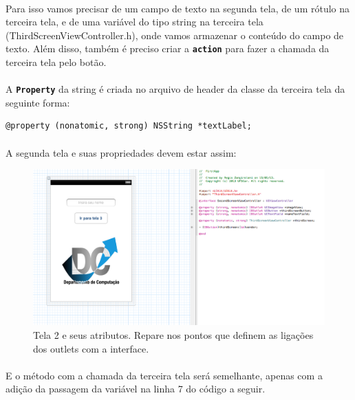 \documentclass[a4paper,12pt,brazil,doubleside]{book}
\begin{document}
\paragraph{}Para isso vamos precisar de um campo de texto na segunda tela, de um rótulo na terceira tela, e de uma variável do tipo string na terceira tela (ThirdScreenViewController.h), onde vamos armazenar o conteúdo do campo de texto. Além disso, também é preciso criar a \texttt{\textbf{action}} para fazer a chamada da terceira tela pelo botão.
\paragraph{}A \texttt{\textbf{Property}} da string é criada no arquivo de header da classe da terceira tela da seguinte forma:

\begin{listing}
\begin{verbatim}
@property (nonatomic, strong) NSString *textLabel;
\end{verbatim}
\end{listing}

\paragraph{}A segunda tela e suas propriedades devem estar assim:

\begin{figure}[h]
  \centering
  \includegraphics[totalheight=0.35\textheight]{figuras/2/xib_tela2_header.png}
  \caption{Tela 2 e seus atributos. Repare nos pontos que definem as ligações dos outlets com a interface.}
  \label{fig:a}
\end{figure}

\paragraph{}E o método com a chamada da terceira tela será semelhante, apenas com a adição da passagem da variável na linha 7 do código a seguir.
\end{document}
